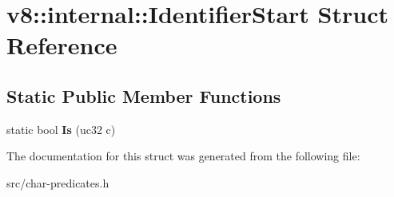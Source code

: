 \hypertarget{structv8_1_1internal_1_1_identifier_start}{}\section{v8\+:\+:internal\+:\+:Identifier\+Start Struct Reference}
\label{structv8_1_1internal_1_1_identifier_start}
\subsection*{Static Public Member Functions}
\begin{DoxyCompactItemize}
\item 
\hypertarget{structv8_1_1internal_1_1_identifier_start_a21ff6b7890b45213d7841a8a571c3e39}{}static bool {\bfseries Is} (uc32 c)\label{structv8_1_1internal_1_1_identifier_start_a21ff6b7890b45213d7841a8a571c3e39}

\end{DoxyCompactItemize}


The documentation for this struct was generated from the following file\+:\begin{DoxyCompactItemize}
\item 
src/char-\/predicates.\+h\end{DoxyCompactItemize}
